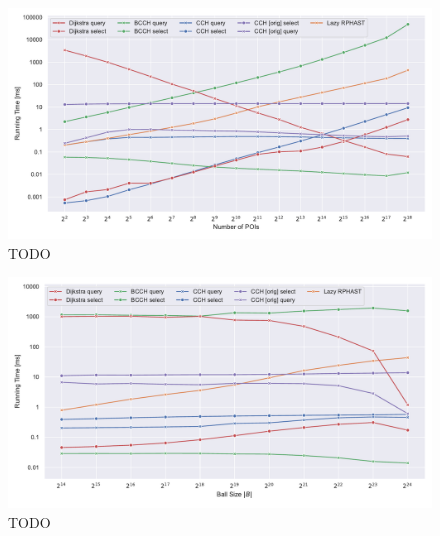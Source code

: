 \documentclass[a4paper, english, cleveref]{lipics-v2021}
\begin{document}
\begin{table}
\setlength{\tabcolsep}{3pt}
\centering
\caption{
TODO
}\label{tab:knn_overview_table}

\end{table}

\begin{figure}
\centering
\includegraphics[width=\linewidth]{fig/repr_knn_num_pois.pdf}
\caption{
TODO
}\label{fig:knn_num_pois}
\end{figure}

\begin{figure}
\centering
\includegraphics[width=\linewidth]{fig/repr_knn_ball_size.pdf}
\caption{
TODO
}\label{fig:knn_ball_size}
\end{figure}
\end{document}
